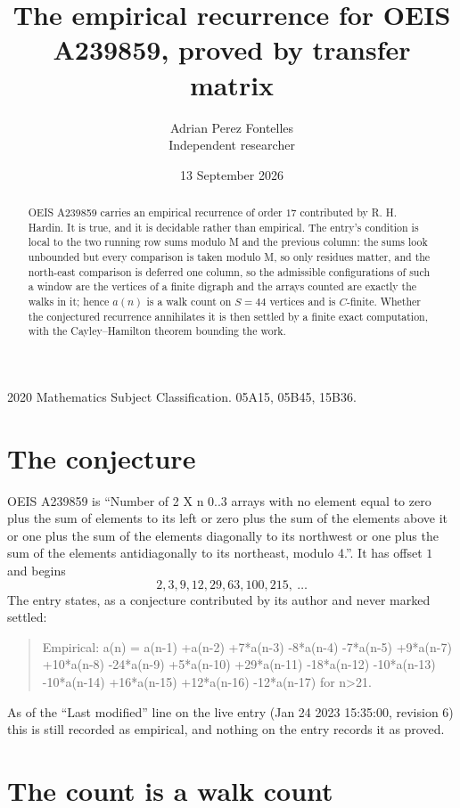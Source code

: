 \documentclass[11pt,a4paper]{article}
\title{The empirical recurrence for OEIS A239859, proved by transfer matrix}
\author{Adrian Perez Fontelles\\ \small Independent researcher}
\date{13 September 2026}
\theoremstyle{plain}
\theoremstyle{definition}
\begin{document}
\maketitle

\begin{abstract}
OEIS A239859 carries an empirical recurrence of order $17$ contributed by R. H. Hardin. It is
true, and it is decidable rather than empirical. The entry's condition is local to the two running row sums modulo M and the previous column: the sums look unbounded but every comparison is taken modulo M, so only residues matter, and the north-east comparison is deferred one column, so
the admissible configurations of such a window are the vertices of a finite digraph and the
arrays counted are exactly the walks in it; hence $a(n)$ is a walk count on $S=44$ vertices
and is $C$-finite. Whether the conjectured recurrence annihilates it is then settled by a
finite exact computation, with the Cayley--Hamilton theorem bounding the work.
\end{abstract}

\noindent\small 2020 Mathematics Subject Classification. 05A15, 05B45, 15B36.\normalsize

\section{The conjecture}

OEIS A239859 is ``Number of 2 X n 0..3 arrays with no element equal to zero plus the sum of elements to its left or zero plus the sum of the elements above it or one plus the sum of the elements diagonally to its northwest or one plus the sum of the elements antidiagonally to its northeast, modulo 4.''. It has offset $1$ and begins
\[
2, 3, 9, 12, 29, 63, 100, 215,\ \dots
\]
The entry states, as a conjecture contributed by its author and never marked settled:
\begin{quote}
Empirical: a(n) = a(n-1) +a(n-2) +7*a(n-3) -8*a(n-4) -7*a(n-5) +9*a(n-7) +10*a(n-8) -24*a(n-9) +5*a(n-10) +29*a(n-11) -18*a(n-12) -10*a(n-13) -10*a(n-14) +16*a(n-15) +12*a(n-16) -12*a(n-17) for n>21.
\end{quote}
As of the ``Last modified'' line on the live entry (Jan 24 2023 15:35:00, revision 6) this is still
recorded as empirical, and nothing on the entry records it as proved.

\section{The count is a walk count}
\end{document}
